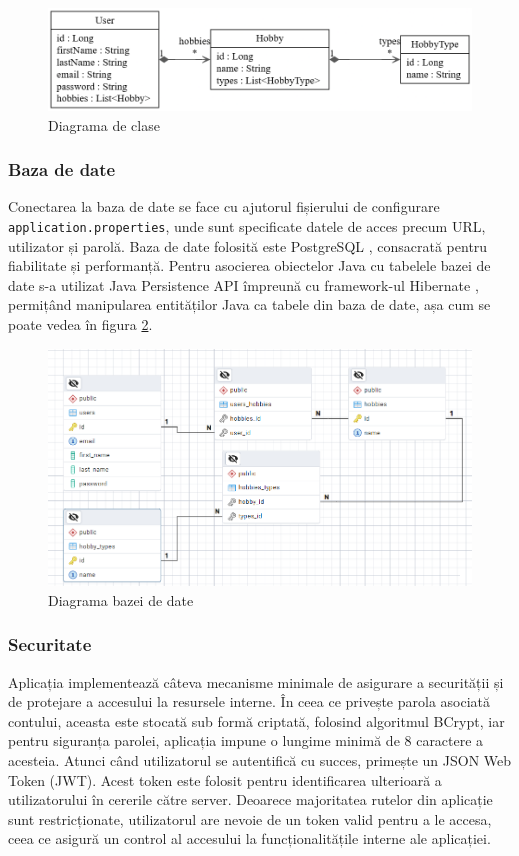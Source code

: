 \begin{figure}[htbp]
	\centering
    \includegraphics[scale=0.45]{./figures/class-diagram.png}
	\caption{Diagrama de clase}
	\label{FigClassDiagram}
\end{figure}

\subsubsection*{Baza de date}
Conectarea la baza de date se face cu ajutorul fișierului de configurare \texttt{application.properties}, unde sunt specificate datele de acces precum URL, utilizator și parolă. 
Baza de date folosită este PostgreSQL \cite{postgresqldocs}, consacrată pentru fiabilitate și performanță. 
Pentru asocierea obiectelor Java cu tabelele bazei de date s-a utilizat Java Persistence API împreună cu framework-ul Hibernate \cite{hibernatedocs}, permițând manipularea entităților Java ca tabele din baza de date, așa cum se poate vedea în figura \ref{FigDbDiagram}.

\begin{figure}[htbp]
	\centering
    \includegraphics[scale=0.65]{./figures/db-diagram.png}
	\caption{Diagrama bazei de date}
	\label{FigDbDiagram}
\end{figure}

\subsubsection*{Securitate}
Aplicația implementează câteva mecanisme minimale de asigurare a securității și de protejare a accesului la resursele interne.
În ceea ce privește parola asociată contului, aceasta este stocată sub formă criptată, folosind algoritmul BCrypt, iar pentru siguranța parolei, aplicația impune o lungime minimă de 8 caractere a acesteia.
Atunci când utilizatorul se autentifică cu succes, primește un JSON Web Token (JWT). Acest token este folosit pentru identificarea ulterioară a utilizatorului în cererile către server.
Deoarece majoritatea rutelor din aplicație sunt restricționate, utilizatorul are nevoie de un token valid pentru a le accesa, ceea ce asigură un control al accesului la funcționalitățile interne ale aplicației.

